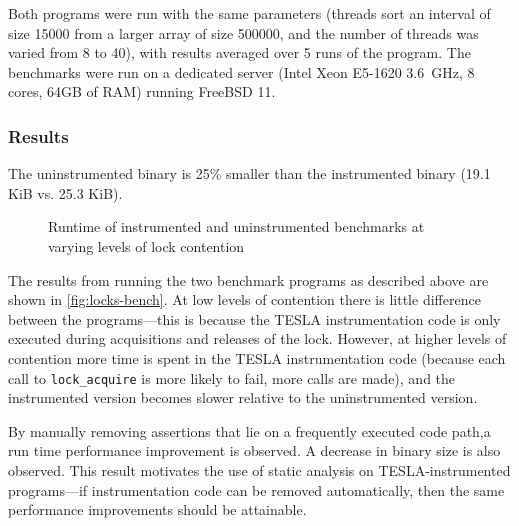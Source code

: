 Both programs were run with the same parameters (threads sort an interval of
size \num{15000} from a larger array of size \num{500000}, and the number of
threads was varied from 8 to 40), with results averaged over 5 runs of the
program. The benchmarks were run on a dedicated server (Intel Xeon E5-1620
\SI{3.6}{\GHz}, 8 cores, 64GB of RAM) running FreeBSD 11.

\subsubsection{Results}

The uninstrumented binary is 25\% smaller than the instrumented binary
(\num{19.1} KiB vs. \num{25.3} KiB).

\begin{figure}
  \centering
  \caption{Runtime of instrumented and uninstrumented benchmarks at
  varying levels of lock contention}
  \label{fig:locks-bench}
\end{figure}

The results from running the two benchmark programs as described above are shown
in \autoref{fig:locks-bench}. At low levels of contention there is little
difference between the programs---this is because the TESLA instrumentation code
is only executed during acquisitions and releases of the lock. However, at
higher levels of contention more time is spent in the TESLA instrumentation code
(because each call to \texttt{lock_acquire} is more likely to fail, more
calls are made), and the instrumented version becomes slower relative to the
uninstrumented version.

By manually removing assertions that lie on a frequently executed code path,a run
time performance improvement is observed. A decrease in binary size is also
observed. This result motivates the use of static analysis on TESLA-instrumented
programs---if instrumentation code can be removed automatically, then the same
performance improvements should be attainable.

